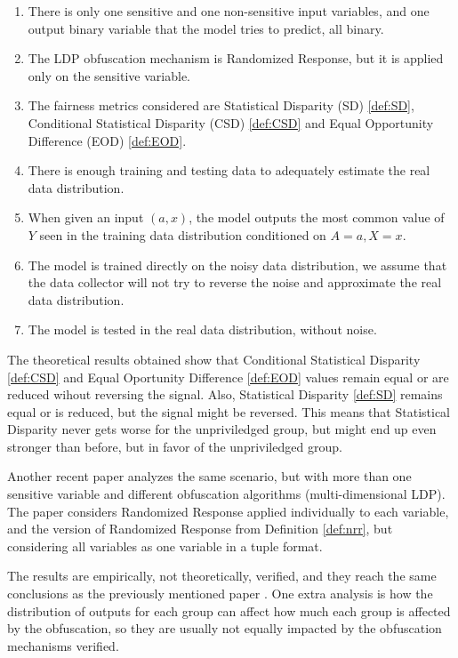 \documentclass[conference]{IEEEtran}
\begin{document}
\begin{enumerate}
\item There is only one sensitive and one non-sensitive input variables, and one output binary variable that the model tries to predict, all binary.
\item The LDP obfuscation mechanism is Randomized Response, but it is applied only on the sensitive variable.
\item The fairness metrics considered are Statistical Disparity (SD) \ref{def:SD}, Conditional Statistical Disparity (CSD) \ref{def:CSD} and Equal Opportunity Difference (EOD) \ref{def:EOD}.
\item There is enough training and testing data to adequately estimate the real data distribution.
\item When given an input $(a,x)$, the model outputs the most common value of $Y$ seen in the training data distribution conditioned on $A=a, X=x$.
\item The model is trained directly on the noisy data distribution, we assume that the data collector will not try to reverse the noise and approximate the real data distribution.
\item The model is tested in the real data distribution, without noise.
\end{enumerate}

The theoretical results obtained show that Conditional Statistical Disparity \ref{def:CSD} and Equal Oportunity Difference \ref{def:EOD} values remain equal or are reduced wihout reversing the signal. Also, Statistical Disparity \ref{def:SD} remains equal or is reduced, but the signal might be reversed. This means that Statistical Disparity never gets worse for the unpriviledged group, but might end up even stronger than before, but in favor of the unpriviledged group.

Another recent paper \cite{makhlouf2024impact} analyzes the same scenario, but with more than one sensitive variable and different obfuscation algorithms (multi-dimensional LDP). The paper considers Randomized Response applied individually to each variable, and the version of Randomized Response from Definition \ref{def:nrr}, but considering all variables as one variable in a tuple format. 

The results are empirically, not theoretically, verified, and they reach the same conclusions as the previously mentioned paper \cite{makhlouf2024systematicformalstudyimpact}. One extra analysis is how the distribution of outputs for each group can affect how much each group is affected by the obfuscation, so they are usually not equally impacted by the obfuscation mechanisms verified.
\end{document}
